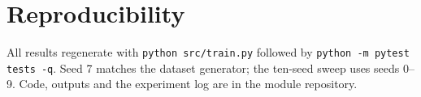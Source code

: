 \documentclass[conference]{IEEEtran}
\begin{document}
\section*{Reproducibility}

All results regenerate with \texttt{python src/train.py} followed by
\texttt{python -m pytest tests -q}. Seed 7 matches the dataset generator; the ten-seed sweep uses
seeds 0--9. Code, outputs and the experiment log are in the module repository.



\end{document}

